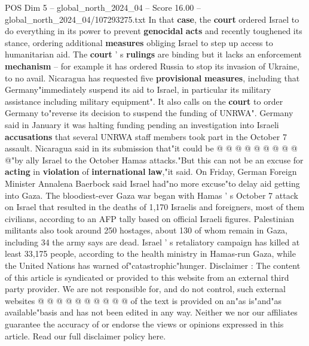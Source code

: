 \begin{textsample}{POS Dim 5 – global\_north\_2024\_04 – Score 16.00 – global\_north\_2024\_04/107293275.txt}
In that \textbf{case}, the \textbf{court} ordered Israel to do everything in its power to prevent \textbf{genocidal} \textbf{acts} and recently toughened its stance, ordering additional \textbf{measures} obliging Israel to step up access to humanitarian aid.
The \textbf{court} ' s \textbf{rulings} are binding but it lacks an enforcement \textbf{mechanism} -- for example it has ordered Russia to stop its invasion of Ukraine, to no avail.
Nicaragua has requested five \textbf{provisional} \textbf{measures}, including that Germany"immediately suspend its aid to Israel, in particular its military assistance including military equipment".
It also calls on the \textbf{court} to order Germany to"reverse its decision to suspend the funding of UNRWA".
Germany said in January it was halting funding pending an investigation into Israeli \textbf{accusations} that several UNRWA staff members took part in the October 7 assault.
Nicaragua said in its submission that"it could be @ @ @ @ @ @ @ @ @ @"by ally Israel to the October Hamas attacks."But this can not be an excuse for \textbf{acting} in \textbf{violation} of \textbf{international} \textbf{law},"it said.
On Friday, German Foreign Minister Annalena Baerbock said Israel had"no more excuse"to delay aid getting into Gaza.
The bloodiest-ever Gaza war began with Hamas ' s October 7 attack on Israel that resulted in the deaths of 1,170 Israelis and foreigners, most of them civilians, according to an AFP tally based on official Israeli figures.
Palestinian militants also took around 250 hostages, about 130 of whom remain in Gaza, including 34 the army says are dead.
Israel ' s retaliatory campaign has killed at least 33,175 people, according to the health ministry in Hamas-run Gaza, while the United Nations has warned of"catastrophic"hunger.
Disclaimer : The content of this article is syndicated or provided to this website from an external third party provider.
We are not responsible for, and do not control, such external websites @ @ @ @ @ @ @ @ @ @ of the text is provided on an"as is"and"as available"basis and has not been edited in any way.
Neither we nor our affiliates guarantee the accuracy of or endorse the views or opinions expressed in this article.
Read our full disclaimer policy here.

\end{textsample}
